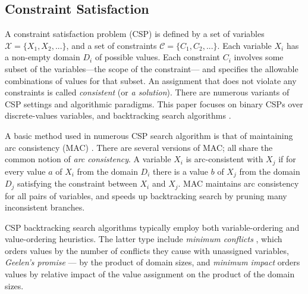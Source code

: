 \subsection{Constraint Satisfaction}

A constraint satisfaction problem (CSP) is defined by a set
of variables $\mathcal{X}=\{X_1, X_2, ...\}$, and a set of
constraints $\mathcal{C}=\{C_1, C_2, ...\}$. Each variable $X_i$ has a non-empty domain
$D_i$ of possible values. Each constraint $C_i$ involves some subset
of the variables---the scope of the constraint--- and specifies the
allowable combinations of values for that subset. An assignment that
does not violate any constraints is called {\em consistent} (or {\em a solution}).
There are numerous variants of CSP settings and algorithmic paradigms. This
paper focuses on binary CSPs over discrete-values variables,
and backtracking search algorithms \cite{Tsang.csp}.

A basic method used in numerous CSP search algorithm is
that of maintaining arc consistency (MAC)
\cite{Sabin.mac}. There are several versions of MAC; all
share the common notion of {\em
arc consistency}.
A variable $X_i$ is arc-consistent with $X_j$ if for every value $a$ of
$X_i$ from the domain $D_i$ there is a value $b$ of $X_j$ from the
domain $D_j$ satisfying the constraint between $X_i$ and $X_j$. MAC
maintains arc consistency for all pairs of variables, and
speeds up backtracking search by pruning many inconsistent
branches.

CSP backtracking search algorithms typically employ
both variable-ordering \cite{Tsang.csp} and value-ordering heuristics.
The latter type include \emph{minimum conflicts} \cite{Tsang.csp}, which
orders values by the number of conflicts they cause
with unassigned variables, \emph{Geelen's promise}
\cite{Geelen.promise} --- by the product of domain sizes,
and \emph{minimum impact}
\cite{Refalo.impact} orders values by relative impact of the value
assignment on the product of the domain sizes.

